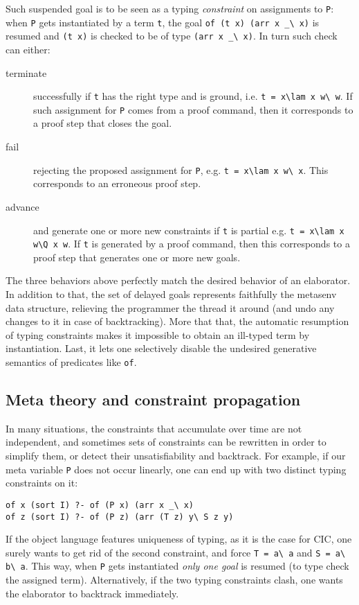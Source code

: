 \documentclass{easychair}
\begin{document}
Such suspended goal is to be seen as a typing \emph{constraint} on
assignments to \verb+P+: when \verb+P+ gets instantiated by a
term \verb+t+, the goal \verb+of (t x) (arr x _\ x)+ is resumed
and \verb+(t x)+ is checked to be of type \verb+(arr x _\ x)+.
In turn such check can either:
\begin{description}
\item[terminate] successfully if \verb+t+ has the right type and is ground,
	i.e. \verb+t = x\lam x w\ w+.  If such assignment for \verb+P+
	comes from a proof command, then it corresponds to a proof
	step that closes the goal.
\item[fail] rejecting the proposed assignment for \verb+P+, e.g. 
	\verb+t = x\lam x w\ x+.  This corresponds to an erroneous proof
	step.
\item[advance] and generate one or more new constraints if \verb+t+ is partial
	e.g. \verb+t = x\lam x w\Q x w+.  If \verb+t+ is generated by
	a proof command, then this corresponds to a proof step that
	generates one or more new goals.
\end{description}
The three behaviors above perfectly match the desired behavior of an
elaborator.  In addition to that, the set of delayed goals
represents faithfully the metasenv data structure, relieving the
programmer the thread it around (and undo any changes to it in case of
backtracking).  More that that, the automatic resumption of typing
constraints makes it impossible to obtain an ill-typed term by
instantiation.  Last, it lets one selectively disable the undesired
generative semantics of predicates like \verb+of+.

\subsection{Meta theory and constraint propagation} %

In many situations, the constraints that accumulate over time are not
independent, and sometimes sets of constraints can be rewritten in
order to simplify them, or detect their unsatisfiability and
backtrack.
For example, if our meta variable \verb+P+ does not occur linearly, one 
can end up with two distinct typing constraints on it:

\begin{Verbatim}
of x (sort I) ?- of (P x) (arr x _\ x)
of z (sort I) ?- of (P z) (arr (T z) y\ S z y)
\end{Verbatim}

If the object language features uniqueness of typing, as it is the case
for CIC, one surely wants to get rid of the second constraint, and
force \verb+T = a\ a+ and \verb+S = a\ b\ a+.
This way, when \verb+P+ gets instantiated \emph{only one goal}
is resumed (to type check the assigned term).  Alternatively,
if the two typing constraints clash, one wants the elaborator to
backtrack immediately.
\end{document}
